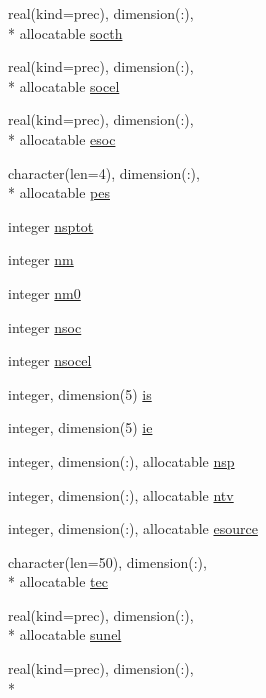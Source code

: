 \begin{DoxyCompactItemize}
real(kind=prec), dimension(\-:), \\*
allocatable \hyperlink{classplantvar_a9cdc1767d27c7362b6c33bc24fbe79ed}{socth}
\item 
real(kind=prec), dimension(\-:), \\*
allocatable \hyperlink{classplantvar_a325e0974aedb888a4814e7d9479c67d3}{socel}
\item 
real(kind=prec), dimension(\-:), \\*
allocatable \hyperlink{classplantvar_a52a6a33ef0efbd1e6b19c59c683db54a}{esoc}
\item 
character(len=4), dimension(\-:), \\*
allocatable \hyperlink{classplantvar_a8b75644cc6f0b1728b0fdcd7c575c177}{pes}
\item 
integer \hyperlink{classplantvar_a1301bcb36aec6c118be8c084932de099}{nsptot}
\item 
integer \hyperlink{classplantvar_a137041d7f1c30cc7d248b9ada4feab69}{nm}
\item 
integer \hyperlink{classplantvar_a56d8f60e631d2b0dc2d7a0252a49e80e}{nm0}
\item 
integer \hyperlink{classplantvar_ac56a3422e256b7cdcc55623af8ba6c7b}{nsoc}
\item 
integer \hyperlink{classplantvar_a56078fb4f499089dd81db61a9e8dfc0f}{nsocel}
\item 
integer, dimension(5) \hyperlink{classplantvar_ab7276bde0d7595d7ce2ef0470ad21ca9}{is}
\item 
integer, dimension(5) \hyperlink{classplantvar_afa98042e93464d6b9c62a51103cd299f}{ie}
\item 
integer, dimension(\-:), allocatable \hyperlink{classplantvar_a16e98f1a836d4de3e5436365e77441b0}{nsp}
\item 
integer, dimension(\-:), allocatable \hyperlink{classplantvar_a019098844671b06b71ae0b76aa3d4fa8}{ntv}
\item 
integer, dimension(\-:), allocatable \hyperlink{classplantvar_ac5590ecfa29690829feb06fd8c1eb839}{esource}
\item 
character(len=50), dimension(\-:), \\*
allocatable \hyperlink{classplantvar_a4de39d7f2e55534eeac1a570bf8d30ff}{tec}
\item 
real(kind=prec), dimension(\-:), \\*
allocatable \hyperlink{classplantvar_ae2c75e1880b14179e8c96c8bd209f26d}{sunel}
\item 
real(kind=prec), dimension(\-:), \\*

\end{DoxyCompactItemize}
